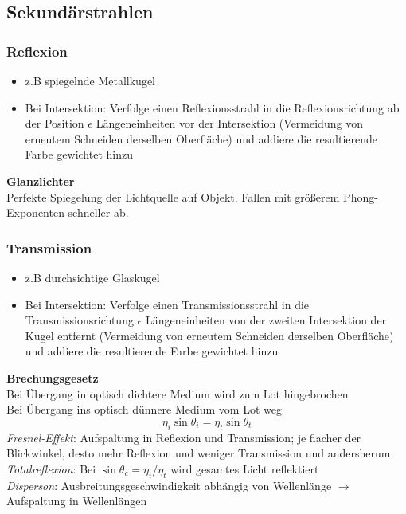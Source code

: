 \subsection{Sekundärstrahlen}%
\label{rt:sub:sekundaerstrahlen}

\subsubsection{Reflexion}%
\label{rt:ssub:reflexion}
    
\begin{itemize}
	\item z.B spiegelnde Metallkugel
	\item Bei Intersektion: Verfolge einen Reflexionsstrahl in die Reflexionsrichtung ab der Position $\epsilon$ Längeneinheiten vor der Intersektion (Vermeidung von erneutem Schneiden derselben Oberfläche) und addiere die resultierende Farbe gewichtet hinzu
\end{itemize}

\textbf{Glanzlichter}\\
Perfekte Spiegelung der Lichtquelle auf Objekt. Fallen mit größerem Phong-Exponenten schneller ab.

\subsubsection{Transmission}%
\label{rt:ssub:transmission}

\begin{itemize}
	\item z.B durchsichtige Glaskugel
	\item Bei Intersektion: Verfolge einen Transmissionsstrahl in die Transmissionsrichtung $\epsilon$ Längeneinheiten von der zweiten Intersektion der Kugel entfernt (Vermeidung von erneutem Schneiden derselben Oberfläche) und addiere die resultierende Farbe gewichtet hinzu
\end{itemize}
\textbf{Brechungsgesetz}\\
Bei Übergang in optisch dichtere Medium wird zum Lot hingebrochen\\
Bei Übergang ins optisch dünnere Medium vom Lot weg\\
$$\eta_i \sin \theta_i = \eta_t \sin \theta_t$$
\textit{Fresnel-Effekt}: Aufspaltung in Reflexion und Transmission; je flacher der Blickwinkel, desto mehr Reflexion und weniger Transmission und andersherum\\
\textit{Totalreflexion}: Bei $\sin \theta_c = \eta_i / \eta_t$ wird gesamtes Licht reflektiert\\
\textit{Disperson}: Ausbreitungsgeschwindigkeit abhängig von Wellenlänge $\rightarrow$ Aufspaltung in Wellenlängen

